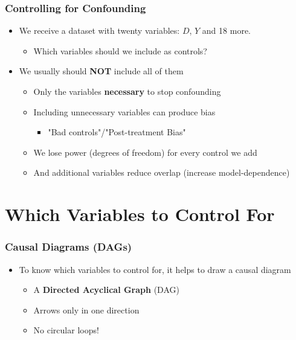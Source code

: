 \documentclass[xcolor=x11names,compress]{beamer}\usepackage[]{graphicx}\usepackage[]{color}
\renewcommand{\(}{\begin{columns}}
\renewcommand{\)}{\end{columns}}
\newcommand{\<}[1]{\begin{column}{#1}}
\renewcommand{\>}{\end{column}}
\begin{document}
\begin{frame}
\frametitle{Controlling for Confounding}
\begin{itemize}
\item We receive a dataset with twenty variables: $D$, $Y$ and 18 more. 
\begin{itemize}
\item Which variables should we include as controls?
\end{itemize}
\pause
\item We usually should \textbf{NOT} include all of them
\pause
\begin{itemize}
\item Only the variables \textbf{necessary} to stop confounding
\pause
\item Including unnecessary variables can produce bias
\begin{itemize}
\item "Bad controls"/"Post-treatment Bias"
\end{itemize}
\pause
\item We lose power (degrees of freedom) for every control we add
\pause
\item And additional variables reduce overlap (increase model-dependence)
\pause
\end{itemize}
\end{itemize}
\end{frame}

\section{Which Variables to Control For}

\begin{frame}
\frametitle{Causal Diagrams (DAGs)}
\begin{itemize}
\item To know which variables to control for, it helps to draw a causal diagram
\pause
\begin{itemize}
\item A \textbf{Directed Acyclical Graph} (DAG)
\pause
\item Arrows only in one direction
\pause
\item No circular loops!
\end{itemize}
\end{itemize}
\end{frame}
\end{document}
